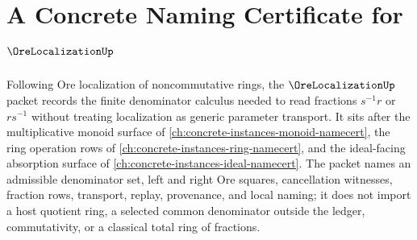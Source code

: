 \chapter{A Concrete Naming Certificate for $\OreLocalizationUp$}
\label{ch:concrete-instances-ore-localization-namecert}

Following Ore localization of noncommutative rings, the $\OreLocalizationUp$ packet records the finite denominator calculus needed to read fractions $s^{-1}r$ or $rs^{-1}$ without treating localization as generic parameter transport. It sits after the multiplicative monoid surface of \autoref{ch:concrete-instances-monoid-namecert}, the ring operation rows of \autoref{ch:concrete-instances-ring-namecert}, and the ideal-facing absorption surface of \autoref{ch:concrete-instances-ideal-namecert}. The packet names an admissible denominator set, left and right Ore squares, cancellation witnesses, fraction rows, transport, replay, provenance, and local naming; it does not import a host quotient ring, a selected common denominator outside the ledger, commutativity, or a classical total ring of fractions.

